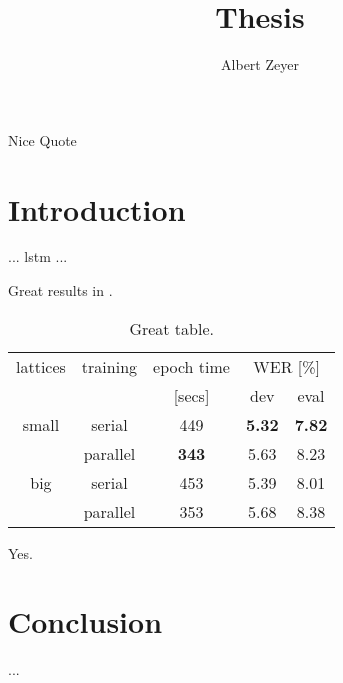 \documentclass[paper=a4,
               fontsize=11pt,
               DIV18,             %
               BCOR15mm,           %
               twoside,           %
               headsepline,       %
               cleardoublepage=empty,  %
               listof=totoc,       %
               bibliography=totoc,  %
               english,          %
               chapterprefix=false,     %
               appendixprefix,
               numbers=noenddot,  %
               captions=tableheading,  %
               ]{scrbook}
\title{Thesis}
\author{Albert Zeyer}
\renewcommand{\backmatter}{
\renewcommand{\thechapter}{\Alph{chapter}}
\setcounter{chapter}{0}
}
\begin{document}
\frontmatter

\pagestyle{empty}

\maketitle

\cleardoublepage

\vspace*{3cm}

\begin{center}
  Nice Quote
\end{center}
\vfill

\cleardoublepage

\pagestyle{empty}

\newpage

\tableofcontents

\mainmatter
\pagestyle{headings}

\chapter{Introduction}
...
\Gls{lstm} \cite{hochreiter1997lstm}
...

Great results in .

\begin{table}[t]
\centering
\caption{Great table.}
\label{tab:sth}
\begin{tabular}{|c|c|c|c|c|}
\hline
lattices & training & epoch time & \multicolumn{2}{c|}{WER [\%]} \\
{}       & {}       & [secs]  & dev & eval \\ \hline \hline
small    & serial & 449  & \textbf{5.32} & \textbf{7.82} \\ \cline{2-5}
{}       & parallel & \textbf{343}  & 5.63 & 8.23 \\ \hline \hline
big      & serial   &   453        & 5.39 & 8.01 \\ \cline{2-5}
{}       & parallel &   353        & 5.68 & 8.38 \\ \hline
\end{tabular}
\end{table}

Yes.

\chapter{Conclusion}
...

\backmatter

\printglossary[title={Glossary}]

\listoffigures

\listoftables


%

\end{document}
